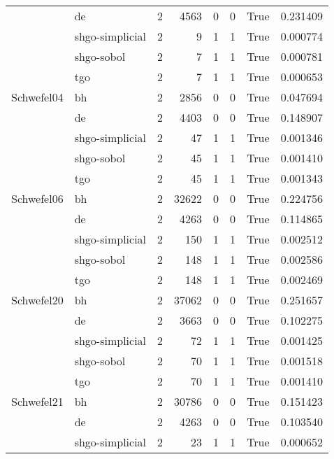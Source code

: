\begin{longtable}{llrrrrlr}
         & de &     2 &     4563 &      0 &       0 &    True &    0.231409 \\
         & shgo-simplicial &     2 &        9 &      1 &       1 &    True &    0.000774 \\
         & shgo-sobol &     2 &        7 &      1 &       1 &    True &    0.000781 \\
         & tgo &     2 &        7 &      1 &       1 &    True &    0.000653 \\
Schwefel04 & bh &     2 &     2856 &      0 &       0 &    True &    0.047694 \\
         & de &     2 &     4403 &      0 &       0 &    True &    0.148907 \\
         & shgo-simplicial &     2 &       47 &      1 &       1 &    True &    0.001346 \\
         & shgo-sobol &     2 &       45 &      1 &       1 &    True &    0.001410 \\
         & tgo &     2 &       45 &      1 &       1 &    True &    0.001343 \\
Schwefel06 & bh &     2 &    32622 &      0 &       0 &    True &    0.224756 \\
         & de &     2 &     4263 &      0 &       0 &    True &    0.114865 \\
         & shgo-simplicial &     2 &      150 &      1 &       1 &    True &    0.002512 \\
         & shgo-sobol &     2 &      148 &      1 &       1 &    True &    0.002586 \\
         & tgo &     2 &      148 &      1 &       1 &    True &    0.002469 \\
Schwefel20 & bh &     2 &    37062 &      0 &       0 &    True &    0.251657 \\
         & de &     2 &     3663 &      0 &       0 &    True &    0.102275 \\
         & shgo-simplicial &     2 &       72 &      1 &       1 &    True &    0.001425 \\
         & shgo-sobol &     2 &       70 &      1 &       1 &    True &    0.001518 \\
         & tgo &     2 &       70 &      1 &       1 &    True &    0.001410 \\
Schwefel21 & bh &     2 &    30786 &      0 &       0 &    True &    0.151423 \\
         & de &     2 &     4263 &      0 &       0 &    True &    0.103540 \\
         & shgo-simplicial &     2 &       23 &      1 &       1 &    True &    0.000652 \\

\end{longtable}
